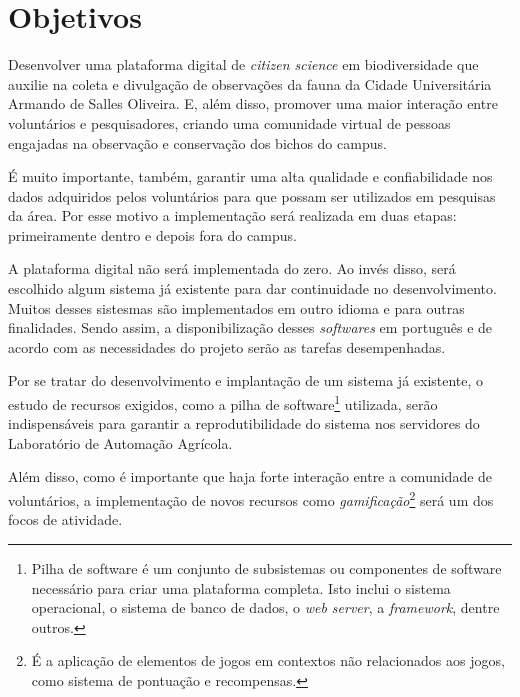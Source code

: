 \section{Objetivos}
Desenvolver uma plataforma digital de \emph{citizen science} em biodiversidade que auxilie na coleta e divulgação de observações da fauna da Cidade Universitária Armando de Salles Oliveira. E, além disso, promover uma maior interação entre voluntários e pesquisadores, criando uma comunidade virtual de pessoas engajadas na observação e conservação dos bichos do campus.

É muito importante, também, garantir uma alta qualidade e confiabilidade nos dados adquiridos pelos voluntários para que possam ser utilizados em pesquisas da área. Por esse motivo a implementação será realizada em duas etapas: primeiramente dentro e depois fora do campus.

A plataforma digital não será implementada do zero. Ao invés disso, será escolhido algum sistema já existente para dar continuidade no desenvolvimento. Muitos desses sistesmas são implementados em outro idioma e para outras finalidades. Sendo assim, a disponibilização desses \emph{softwares} em português e de acordo com as necessidades do projeto serão as tarefas desempenhadas.

Por se tratar do desenvolvimento e implantação de um sistema já existente, o estudo de recursos exigidos, como a pilha de software\footnote{Pilha de software é um conjunto de subsistemas ou componentes de software necessário para criar uma plataforma completa. Isto inclui o sistema operacional, o sistema de banco de dados, o \emph{web server}, a \emph{framework}, dentre outros.} utilizada, serão indispensáveis para garantir a reprodutibilidade do sistema nos servidores do Laboratório de Automação Agrícola.

Além disso, como é importante que haja forte interação entre a comunidade de voluntários, a implementação de novos recursos como \emph{gamificação}\footnote{É a aplicação de elementos de jogos em contextos não relacionados aos jogos, como sistema de pontuação e recompensas.} será um dos focos de atividade.